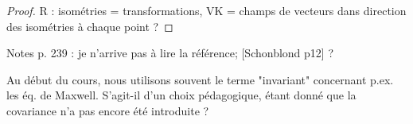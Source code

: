 \begin{proof}
    R : isométries = transformations, VK = champs de vecteurs dans direction des isométries à chaque point ?
\end{proof}
\begin{quest}
    Notes p. 239 : je n'arrive pas à lire la référence; [Schonblond p12] ?
\end{quest}
\begin{quest}
    Au début du cours, nous utilisons souvent le terme "invariant" concernant p.ex. les éq. de Maxwell. S'agit-il d'un choix pédagogique, étant donné que la covariance n'a pas encore été introduite ?
\end{quest}